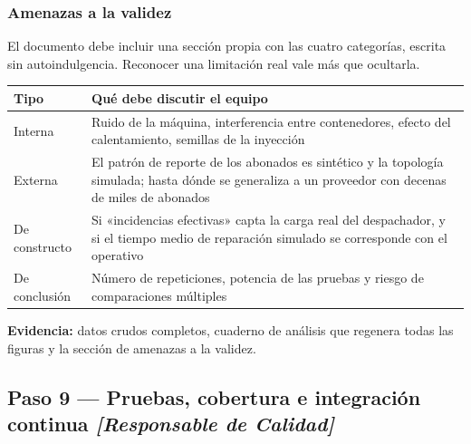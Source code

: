 \documentclass[11pt,a4paper]{article}
\newcommand{\paso}[1]{\subsection{#1}}
\begin{document}
	\subsubsection{Amenazas a la validez}
	
	El documento debe incluir una sección propia con las cuatro categorías, escrita sin autoindulgencia. Reconocer una limitación real vale más que ocultarla.
	
	\begin{center}
		\small
		\begin{tabular}{@{}p{3.0cm}p{11.9cm}@{}}
			\toprule
			\textbf{Tipo} & \textbf{Qué debe discutir el equipo} \\
			\midrule
			Interna & Ruido de la máquina, interferencia entre contenedores, efecto del calentamiento, semillas de la inyección \\
			\addlinespace
			Externa & El patrón de reporte de los abonados es sintético y la topología simulada; hasta dónde se generaliza a un proveedor con decenas de miles de abonados \\
			\addlinespace
			De constructo & Si «incidencias efectivas» capta la carga real del despachador, y si el tiempo medio de reparación simulado se corresponde con el operativo \\
			\addlinespace
			De conclusión & Número de repeticiones, potencia de las pruebas y riesgo de comparaciones múltiples \\
			\bottomrule
		\end{tabular}
	\end{center}
	
	\textbf{Evidencia:} datos crudos completos, cuaderno de análisis que regenera todas las figuras y la sección de amenazas a la validez.
	
	\paso{Paso 9 --- Pruebas, cobertura e integración continua \emph{[Responsable de Calidad]}}
	
\end{document}
